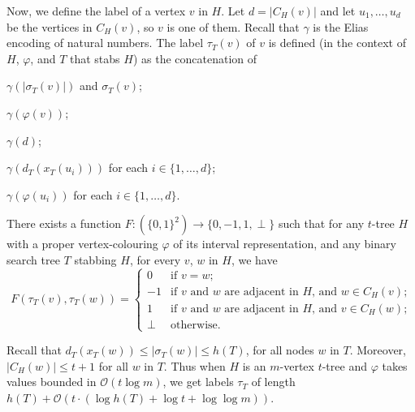 \documentclass[kpfonts]{patmorin}
\newcommand{\Oh}{\mathcal{O}}
\let\le\leqslant
\let\leq\leqslant
\begin{document}
Now, we define the label of a vertex $v$ in $H$. 
Let $d=|C_H(v)|$ and let $u_1,\ldots, u_d$ be the vertices in $C_H(v)$, so $v$ is one of them. 
Recall that $\gamma$ is the Elias encoding of natural numbers.
The label $\tau_T(v)$ of $v$ is defined 
(in the context of $H$, $\varphi$, and $T$ that stabs $H$) 
as the concatenation of
\begin{compactenum}[(T1)]
  \item $\gamma(|\sigma_{T}(v)|)$ and $\sigma_{T}(v)$;
  \item $\gamma(\varphi(v))$;
  \item $\gamma(d)$;
  \item $\gamma(d_{T}(x_T(u_i)))$ for each $i\in\{1,\ldots,d\}$;
  \item $\gamma(\varphi(u_i))$ for each $i\in\{1,\ldots,d\}$.
  \end{compactenum}
\begin{lem}
  There exists a function $F:(\{0,1\}^2)\to\{0,-1,1,\perp\}$ such that
  for any $t$-tree $H$ %
  with a proper vertex-colouring $\varphi$ of its interval representation, %
  and any binary search tree $T$ stabbing $H$,
  for every $v$, $w$ in $H$, we have
  \[
      F(\tau_{T}(v),\tau_{T}(w)) = \begin{cases}
      0 & \text{if $v=w$;} \\
      -1 & \text{if $v$ and $w$ are adjacent in $H$, and $w\in C_H(v)$;} \\
      1 & \text{if $v$ and $w$ are adjacent in $H$, and $v\in C_H(w)$;} \\
      \perp & \text{otherwise.}
    \end{cases}
  \]
\end{lem}
Recall that $d_T(x_T(w)) \le |\sigma_T(w)|\leq h(T)$, for all nodes $w$ in $T$. 
Moreover, $|C_H(w)|\leq t+1$ for all $w$ in $T$. 
Thus when $H$ is an $m$-vertex $t$-tree and $\varphi$ takes values bounded in $\Oh(t\log m)$,
we get labels $\tau_T$ of length
$h(T) + \Oh(t\cdot (\log h(T) + \log t + \log\log m))$.
\end{document}
